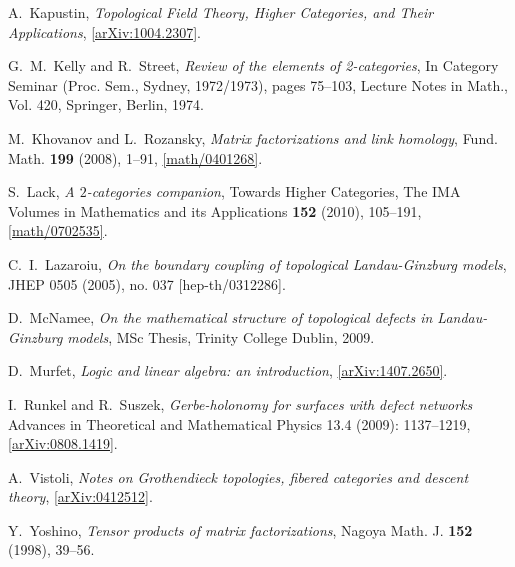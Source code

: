\documentclass[english,letter paper,12pt,leqno]{article}
\theoremstyle{example}
\numberwithin{equation}{section}
\begin{document}
\begin{thebibliography}{BHLS03}
A.~Kapustin, \textsl{Topological {F}ield {T}heory, {H}igher {C}ategories, and
  {T}heir {A}pplications},
  \href{http://arxiv.org/abs/1004.2307}{[arXiv:1004.2307]}.
  
G.~M.~Kelly and R.~Street, \textsl{Review of the elements of 2-categories}, In Category Seminar (Proc. Sem., Sydney, 1972/1973), pages 75--103, Lecture Notes in Math., Vol. 420, Springer, Berlin, 1974.

M.~Khovanov and L.~Rozansky, \textsl{Matrix factorizations and link homology}, Fund. Math.
  \textbf{199} (2008), 1--91,
  \href{http://arxiv.org/abs/math/0401268}{[math/0401268]}.
  
S.~Lack, \textsl{A $2$-categories companion}, 
Towards Higher Categories, 
The IMA Volumes in Mathematics and its Applications \textbf{152} (2010), 105--191, 
\href{http://arxiv.org/abs/math/0702535}{[math/0702535]}.

C.~I.~Lazaroiu, \textsl{On the boundary coupling of topological {L}andau-{G}inzburg models}, JHEP 0505 (2005), no. 037 [hep-th/0312286].
  
D.~McNamee, \textsl{On the mathematical structure of topological defects in
  {L}andau-{G}inzburg models}, MSc Thesis, Trinity College Dublin, 2009.
  

D.~Murfet, \textsl{Logic and linear algebra: an introduction}, \href{http://arxiv.org/abs/1407.2650}{[arXiv:1407.2650]}.


I.~Runkel and R.~Suszek, \textsl{Gerbe-holonomy for surfaces with defect networks} Advances in Theoretical and Mathematical Physics 13.4 (2009): 1137--1219, \href{http://arxiv.org/abs/0808.1419}{[arXiv:0808.1419]}.

A.~Vistoli, \textsl{Notes on {G}rothendieck topologies, fibered categories and descent theory}, \href{http://arxiv.org/abs/math/0412512}{[arXiv:0412512]}.

Y.~Yoshino, \textsl{Tensor products of matrix factorizations}, Nagoya Math. J.
  \textbf{152} (1998), 39--56.
  
\end{thebibliography}
\end{document}

